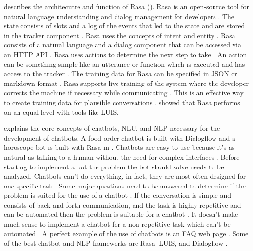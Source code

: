 \citet{rasabocklisch2017} describes the architecutre and function of Rasa (\citet{singhbuilding, braunEvaluatingNLU, buiildChatbotsPython}).
Rasa is an open-source tool for natural language understanding and dialog management for developers \cite{rasabocklisch2017}.
The state consists of slots and a log of the events that led to the state and are stored in the tracker component \cite{rasabocklisch2017}. Rasa uses the concepts of intent and entity \cite{rasabocklisch2017}. Rasa consists of a natural language and a dialog component that can be accessed via an HTTP API \cite{rasabocklisch2017}.
Rasa uses actions to determine the next step to take \cite{rasabocklisch2017}. An action can be something simple like an utterance or function which is executed and has access to the tracker \cite{rasabocklisch2017}.
The training data for Rasa can be specified in JSON or markdown format \cite{rasabocklisch2017}.
Rasa supports live training of the system where the developer corrects the machine if necessary while communicating \cite{rasabocklisch2017}.
This is an effective way to create training data for plausible conversations \cite{rasabocklisch2017}.
\citet{braunEvaluatingNLU} showed that Rasa performs on an equal level with tools like LUIS.

\citet{buiildChatbotsPython} explains the core concepts of chatbots, NLU, and NLP necessary for the development of chatbots.
A food order chatbot is built with Dialogflow and a horoscope bot is built with Rasa in \citet{buiildChatbotsPython}.
Chatbots are easy to use because it's as natural as talking to a human without the need for complex interfaces \cite{buiildChatbotsPython}.
Before starting to implement a bot the problem the bot should solve needs to be analyzed.
Chatbots can't do everything, in fact, they are most often designed for one specific task \cite{buiildChatbotsPython}.
Some major questions need to be answered to determine if the problem is suited for the use of a chatbot \cite{buiildChatbotsPython}.
If the conversation is simple and consists of back-and-forth communication, and the task is highly repetitive and can be automated then the problem is suitable for a chatbot \cite{buiildChatbotsPython}.
It doesn't make much sense to implement a chatbot for a non-repetitive task which can't be automated \cite{buiildChatbotsPython}.
A perfect example of the use of chatbots is an FAQ web page \cite{buiildChatbotsPython}.
Some of the best chatbot and NLP frameworks are Rasa, LUIS, and Dialogflow \cite{buiildChatbotsPython}.

